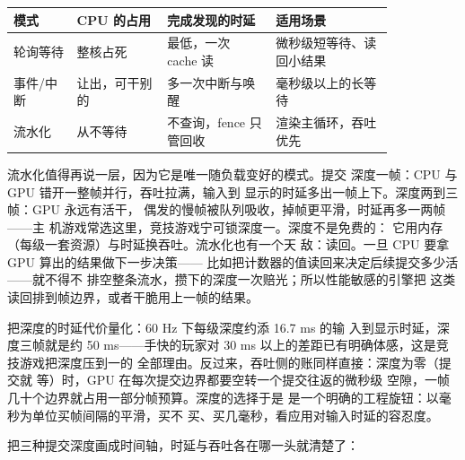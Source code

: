 \begin{longtable}{L{0.14\linewidth}L{0.2\linewidth}L{0.24\linewidth}L{0.26\linewidth}}
\toprule
模式 & CPU 的占用 & 完成发现的时延 & 适用场景 \\
\midrule
轮询等待 & 整核占死 & 最低，一次 cache 读 & 微秒级短等待、读回小结果 \\\tablerowrule
事件/中断 & 让出，可干别的 & 多一次中断与唤醒 & 毫秒级以上的长等待 \\\tablerowrule
流水化 & 从不等待 & 不查询，fence 只管回收 & 渲染主循环，吞吐优先 \\
\bottomrule
\end{longtable}

流水化值得再说一层，因为它是唯一随负载变好的模式。提交
深度一帧：CPU 与 GPU 错开一整帧并行，吞吐拉满，输入到
显示的时延多出一帧上下。深度两到三帧：GPU 永远有活干，
偶发的慢帧被队列吸收，掉帧更平滑，时延再多一两帧——主
机游戏常选这里，竞技游戏宁可锁深度一。深度不是免费的：
它用内存（每级一套资源）与时延换吞吐。流水化也有一个天
敌：读回。一旦 CPU 要拿 GPU 算出的结果做下一步决策——
比如把计数器的值读回来决定后续提交多少活——就不得不
排空整条流水，攒下的深度一次赔光；所以性能敏感的引擎把
这类读回排到帧边界，或者干脆用上一帧的结果。

把深度的时延代价量化：60 Hz 下每级深度约添 16.7 ms 的输
入到显示时延，深度三帧就是约 50 ms——手快的玩家对 30
ms 以上的差距已有明确体感，这是竞技游戏把深度压到一的
全部理由。反过来，吞吐侧的账同样直接：深度为零（提交就
等）时，GPU 在每次提交边界都要空转一个提交往返的微秒级
空隙，一帧几十个边界就占用一部分帧预算。深度的选择于是
是一个明确的工程旋钮：以毫秒为单位买帧间隔的平滑，买不
买、买几毫秒，看应用对输入时延的容忍度。

把三种提交深度画成时间轴，时延与吞吐各在哪一头就清楚了：

